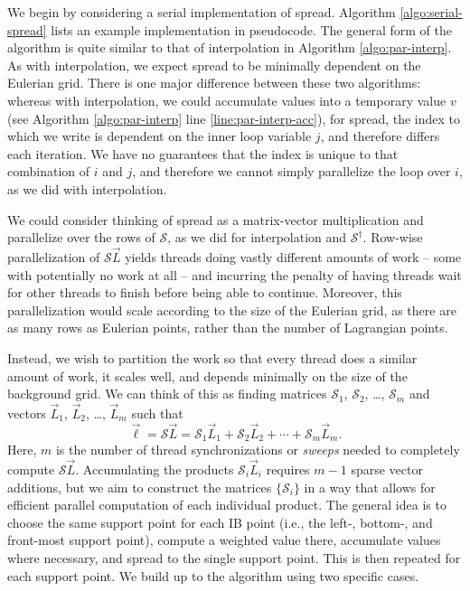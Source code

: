 We begin by considering a serial implementation of spread. Algorithm
\ref{algo:serial-spread} lists an example implementation in pseudocode. The
general form of the algorithm is quite similar to that of interpolation in
Algorithm \ref{algo:par-interp}. As with interpolation, we expect spread to be
minimally dependent on the Eulerian grid. There is one major difference between
these two algorithms: whereas with interpolation, we could accumulate values
into a temporary value $v$ (see Algorithm \ref{algo:par-interp} line
\ref{line:par-interp-acc}), for spread, the index to which we write is
dependent on the inner loop variable $j$, and therefore differs each iteration.
We have no guarantees that the index is unique to that combination of $i$ and
$j$, and therefore we cannot simply parallelize the loop over $i$, as we did
with interpolation.

We could consider thinking of spread as a matrix-vector multiplication and
parallelize over the rows of $\mathcal{S}$, as we did for interpolation and
$\mathcal{S}^\dagger$. Row-wise parallelization of $\mathcal{S}\vec{L}$ yields
threads doing vastly different amounts of work -- some with potentially no work
at all -- and incurring the penalty of having threads wait for other threads to
finish before being able to continue. Moreover, this parallelization would
scale according to the size of the Eulerian grid, as there are as many rows as
Eulerian points, rather than the number of Lagrangian points.

Instead, we wish to partition the work so that every thread does a similar
amount of work, it scales well, and depends minimally on the size of the
background grid. We can think of this as finding matrices $\mathcal{S}_1$,
$\mathcal{S}_2$, \dots, $\mathcal{S}_m$ and vectors $\vec{L}_1$, $\vec{L}_2$,
\dots, $\vec{L}_m$ such that
\begin{equation*}
    \vec{\ell} = \mathcal{S}\vec{L} = \mathcal{S}_1\vec{L}_1 + \mathcal{S}_2\vec{L}_2 + \cdots + \mathcal{S}_m\vec{L}_m.
\end{equation*}
Here, $m$ is the number of thread synchronizations or \emph{sweeps} needed to
completely compute $\mathcal{S}\vec{L}$. Accumulating the products
$\mathcal{S}_i\vec{L}_i$ requires $m-1$ sparse vector additions, but we aim to
construct the matrices $\{\mathcal{S}_i\}$ in a way that allows for efficient
parallel computation of each individual product. The general idea is to choose
the same support point for each IB point (i.e., the left-, bottom-, and
front-most support point), compute a weighted value there, accumulate values
where necessary, and spread to the single support point. This is then repeated
for each support point. We build up to the algorithm using two specific cases.

